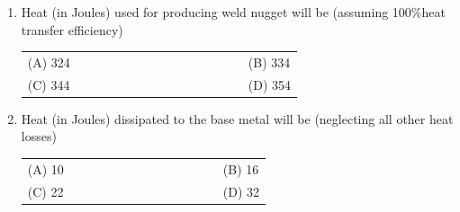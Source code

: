 \documentclass[a4paper,12pt]{article}
\begin{document}
\begin{enumerate}[label=Q.\arabic*), leftmargin=*, resume]

\item Heat (in Joules) used for producing weld nugget will be (assuming 100\%heat transfer efficiency)
\begin{multicols}{2}
\begin{tabular}[t]{p{0.8\linewidth} p{0.9\linewidth}}
(A) 324 & (B) 334 \\
(C) 344 & (D) 354 \\
\end{tabular}
\end{multicols}

\item Heat (in Joules) dissipated to the base metal will be (neglecting all other heat losses)
\begin{multicols}{2}
\begin{tabular}[t]{p{0.8\linewidth} p{0.9\linewidth}}
(A) 10 & (B) 16 \\
(C) 22 & (D) 32 \\
\end{tabular}
\end{multicols}


\end{enumerate}
\end{document}
